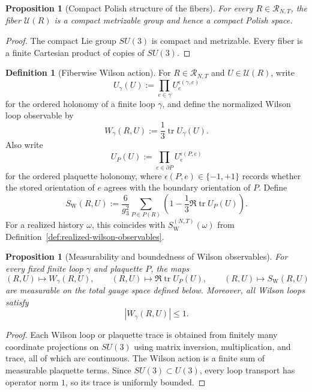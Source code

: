\documentclass[11pt]{article}
\newtheorem{proposition}[theorem]{Proposition}
\theoremstyle{definition}
\newtheorem{definition}[theorem]{Definition}
\theoremstyle{remark}
\newcommand{\tr}{\operatorname{tr}}
\begin{document}
\begin{proposition}[Compact Polish structure of the fibers]
\label{prop:fiber-compact-polish}
For every \(R\in\mathscr R_{N,T}\), the fiber \(\mathscr U(R)\) is a compact
metrizable group and hence a compact Polish space.
\end{proposition}

\begin{proof}
The compact Lie group \(SU(3)\) is compact and metrizable. Every fiber is a
finite Cartesian product of copies of \(SU(3)\).
\end{proof}

\begin{definition}[Fiberwise Wilson action]
\label{def:fiberwise-wilson-action}
For \(R\in\mathscr R_{N,T}\) and \(U\in\mathscr U(R)\), write
\[
U_\gamma(U):=\prod_{e\in\gamma} U_e^{\epsilon(\gamma,e)}
\]
for the ordered holonomy of a finite loop \(\gamma\), and define the normalized
Wilson loop observable by
\[
W_\gamma(R,U):=\frac13\tr U_\gamma(U).
\]
Also write
\[
U_P(U):=\prod_{e\in\partial P} U_e^{\epsilon(P,e)}
\]
for the ordered plaquette holonomy, where \(\epsilon(P,e)\in\{-1,+1\}\) records
whether the stored orientation of \(e\) agrees with the boundary orientation of
\(P\). Define
\[
S_{\mathrm W}(R,U)
:=
\frac{6}{g_3^2}
\sum_{P\in P(R)}
\left(
1-\frac13\Re\tr U_P(U)
\right).
\]
For a realized history \(\omega\), this coincides with
\(S_{\mathrm W}^{(N,T)}(\omega)\) from
Definition~\ref{def:realized-wilson-observables}.
\end{definition}

\begin{proposition}[Measurability and boundedness of Wilson observables]
\label{prop:wilson-observable-measurable-bounded}
For every fixed finite loop \(\gamma\) and plaquette \(P\), the maps
\[
(R,U)\mapsto W_\gamma(R,U),\qquad
(R,U)\mapsto \Re\tr U_P(U),\qquad
(R,U)\mapsto S_{\mathrm W}(R,U)
\]
are measurable on the total gauge space defined below. Moreover, all Wilson
loops satisfy
\[
|W_\gamma(R,U)|\le 1.
\]
\end{proposition}

\begin{proof}
Each Wilson loop or plaquette trace is obtained from finitely many coordinate
projections on \(SU(3)\) using matrix inversion, multiplication, and trace, all
of which are continuous. The Wilson action is a finite sum of measurable
plaquette terms. Since \(SU(3)\subset U(3)\), every loop transport has operator
norm \(1\), so its trace is uniformly bounded.
\end{proof}
\end{document}
